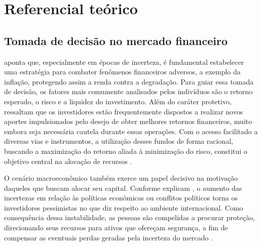 
\chapter{Referencial teórico}
\label{chap_referencial_teorico}

\section{Tomada de decisão no mercado financeiro}
\label{sec_tomada_de_decisao_no_mercado_financeiro}

 aponta que, especialmente em épocas de incerteza, é fundamental estabelecer uma estratégia para combater fenômenos financeiros adversos, a exemplo da inflação, protegendo assim a renda contra a degradação. Para guiar essa tomada de decisão, os fatores mais comumente analisados pelos indivíduos são o retorno esperado, o risco e a liquidez do investimento. Além do caráter protetivo,  ressaltam que os investidores estão frequentemente dispostos a realizar novos aportes impulsionados pelo desejo de obter melhores retornos financeiros, muito embora seja necessária cautela durante essas operações. Com o acesso facilitado a diversas vias e instrumentos, a utilização desses fundos de forma racional, buscando a maximização do retorno aliada à minimização do risco, constitui o objetivo central na alocação de recursos \cite{paiva2019decision,adil2022financial}.

O cenário macroeconômico também exerce um papel decisivo na motivação daqueles que buscam alocar seu capital. Conforme explicam , o aumento das incertezas em relação às políticas econômicas ou conflitos políticos torna os investidores pessimistas no que diz respeito ao ambiente internacional. Como consequência dessa instabilidade, as pessoas são compelidas a procurar proteção, direcionando seus recursos para ativos que ofereçam segurança, a fim de compensar as eventuais perdas geradas pela incerteza do mercado \cite{umar2021bitcoin}.

